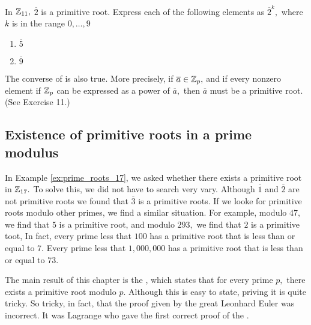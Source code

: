 \documentclass[letterpaper, 11 pt]{ximera}
\theoremstyle{definition}
\begin{document}
\begin{question}
    In $\mathbb Z_{11},$ $\overline{2}$ is a primitive root.  Express each of the following elements as $\overline{2}^k,$ where $k$ is in the range $0,\dots,9$
    
    \begin{enumerate}
        \item $\overline{5}$
        
        \item $\overline{9}$
        
    \end{enumerate}
\end{question}

The converse of  is also true. More precisely, if $\overline{a}\in\mathbb Z_p,$ and if every nonzero element if $\mathbb Z_p$ can be expressed as a power of $\overline{a},$ then $\overline{a}$ must be a primitive root. (See Exercise 11.) 

\subsection*{Existence of primitive roots in a prime modulus}

In Example \ref{ex:prime_roots_17}, we asked whether there exists a primitive root in $\mathbb Z_{17}.$ To solve this, we did not have to search very vary. Although $\overline{1}$ and $\overline{2}$ are not primitive roots we found that $\overline{3}$ is a primitive roots. If we looke for primitive roots modulo other primes, we find a similar situation. For example, modulo $47,$ we find that $5$ is a primitive root, and modulo $293,$ we find that $2$ is a primitive toot, In fact, every prime less that $100$ has a primitive root that is less than or equal to $7.$ Every prime less that $1,000,000$ has a primitive root that is less than or equal to $73.$

The main result of this chapter is the , which states that for every prime $p,$ there exists a primitive root modulo $p.$ Although this is easy to state, priving it is quite tricky. So tricky, in fact, that the proof given by the great Leonhard Euler was incorrect. It was Lagrange who gave the first correct proof of the .
\end{document}
